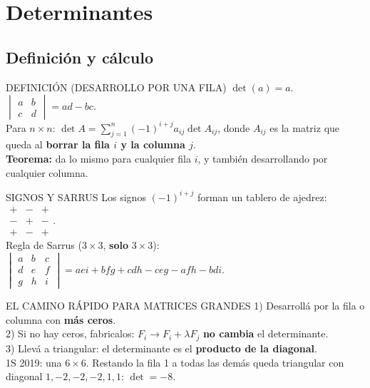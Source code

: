 \chapter{Determinantes}

\section{Definición y cálculo}
\begin{sello}{DEFINICIÓN (DESARROLLO POR UNA FILA)}
$\det(a)=a$. \quad $\begin{vmatrix}a&b\\c&d\end{vmatrix}=ad-bc$.\\[3pt]
Para $n\times n$: $\det A=\displaystyle\sum_{j=1}^n(-1)^{i+j}a_{ij}\det A_{ij}$, donde $A_{ij}$ es la matriz que queda al \textbf{borrar la fila $i$ y la columna $j$}.\\[2pt]
\textbf{Teorema:} da lo mismo para cualquier fila $i$, y también desarrollando por cualquier columna.
\end{sello}
\begin{memo}{SIGNOS Y SARRUS}
Los signos $(-1)^{i+j}$ forman un tablero de ajedrez: $\begin{smallmatrix}+&-&+\\-&+&-\\+&-&+\end{smallmatrix}$.\\[2pt]
Regla de Sarrus ($3\times3$, \textbf{solo} $3\times3$):\\
$\begin{vmatrix}a&b&c\\d&e&f\\g&h&i\end{vmatrix}=aei+bfg+cdh-ceg-afh-bdi$.
\end{memo}
\begin{metodo}{EL CAMINO RÁPIDO PARA MATRICES GRANDES}
1) Desarrollá por la fila o columna con \textbf{más ceros}.\\
2) Si no hay ceros, fabricalos: $F_i\to F_i+\lambda F_j$ \textbf{no cambia} el determinante.\\
3) Llevá a triangular: el determinante es el \textbf{producto de la diagonal}.\\[2pt]
1S 2019: una $6\times6$. Restando la fila 1 a todas las demás queda triangular con diagonal $1,-2,-2,-2,1,1$: $\det=-8$.
\end{metodo}

